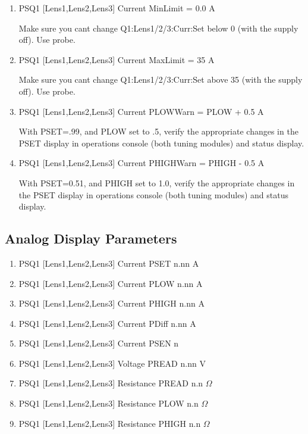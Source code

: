 \documentclass[11pt]{book}		%
\begin{document}
\begin{enumerate}
 \item PSQ1 [Lens1,Lens2,Lens3] Current MinLimit = 0.0 A

\color{red}
Make sure you cant change Q1:Lens1/2/3:Curr:Set below 0 (with the supply off). Use probe.
\color{black}

 \item PSQ1 [Lens1,Lens2,Lens3] Current MaxLimit = 35 A

\color{red}
Make sure you cant change Q1:Lens1/2/3:Curr:Set above 35 (with the supply off). Use probe.
\color{black}

 \item PSQ1 [Lens1,Lens2,Lens3] Current PLOWWarn = PLOW + 0.5 A

\color{red}
With PSET=.99, and PLOW set to .5, verify the appropriate changes in the PSET display in operations console (both tuning modules) and status display.
\color{black}

 \item PSQ1 [Lens1,Lens2,Lens3] Current PHIGHWarn = PHIGH - 0.5 A

\color{red}
With PSET=0.51, and PHIGH set to 1.0, verify the appropriate changes in the PSET display in operations console (both tuning modules) and status display.
\color{black}

\end{enumerate}

\subsection{Analog Display Parameters} \label{sect:cyc-equip-ctl-beamline-quad1-analog-display}

\begin{enumerate}
 \item PSQ1 [Lens1,Lens2,Lens3] Current PSET  n.nn A
 \item PSQ1 [Lens1,Lens2,Lens3] Current PLOW  n.nn A
 \item PSQ1 [Lens1,Lens2,Lens3] Current PHIGH n.nn A
 \item PSQ1 [Lens1,Lens2,Lens3] Current PDiff n.nn A
 \item PSQ1 [Lens1,Lens2,Lens3] Current PSEN  n
 \item PSQ1 [Lens1,Lens2,Lens3] Voltage PREAD n.nn V
 \item PSQ1 [Lens1,Lens2,Lens3] Resistance PREAD n.n $\Omega$
 \item PSQ1 [Lens1,Lens2,Lens3] Resistance PLOW n.n $\Omega$
 \item PSQ1 [Lens1,Lens2,Lens3] Resistance PHIGH n.n $\Omega$
\end{enumerate}
\end{document}
